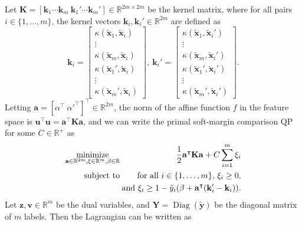 \documentclass[twoside,11pt]{article}
\newcommand{\RR}{\mathbb R}
\DeclareMathOperator*{\Diag}{Diag}
\DeclareMathOperator*{\minimize}{minimize}
\begin{document}
Let $\mathbf K=[
\mathbf k_1\cdots \mathbf k_m
\ \mathbf k_1'\cdots \mathbf k_m']\in\RR^{2m\times 2m}$ be the
kernel matrix, where for all pairs $i\in\{1, \dots, m\}$, the kernel
vectors $\mathbf k_i,\mathbf k_i'\in\RR^{2m}$ are defined as
\begin{equation}
  \mathbf k_i = \left[
    \begin{array}{c}
      \kappa(\mathbf{\tilde x}_1, \mathbf{\tilde x}_i)\\
      \vdots\\
      \kappa(\mathbf{\tilde x}_m, \mathbf{\tilde x}_i)\\
      \kappa(\mathbf{\tilde x}_1', \mathbf{\tilde x}_i)\\
      \vdots\\
      \kappa(\mathbf{\tilde x}_m', \mathbf{\tilde x}_i)
    \end{array}
  \right],\ 
  \mathbf k_i' = \left[
    \begin{array}{c}
      \kappa(\mathbf{\tilde x}_1, \mathbf{\tilde x}_i')\\
      \vdots\\
      \kappa(\mathbf{\tilde x}_m, \mathbf{\tilde x}_i')\\
      \kappa(\mathbf{\tilde x}_1', \mathbf{\tilde x}_i')\\
      \vdots\\
      \kappa(\mathbf{\tilde x}_m', \mathbf{\tilde x}_i')
    \end{array}
  \right].
\end{equation}
Letting $\mathbf a=[\alpha^\intercal\
\alpha'^\intercal]^\intercal\in\RR^{2m}$, the norm of the affine
function $f$ in the feature space is $\mathbf u^\intercal \mathbf u =
\mathbf a^\intercal \mathbf K \mathbf a$, and we can write the primal soft-margin
comparison QP for some $C\in\RR^+$ as
\begin{eqnarray}
  \minimize_{\mathbf a\in\RR^{2m},\mathbf \xi\in\RR^m,\beta\in\RR}\ \ &&\hskip -0.5cm 
  \frac 1 2 \mathbf a^\intercal \mathbf K \mathbf a + C\sum_{i=1}^m \xi_i \\
  \text{subject to}\ \ &&\hskip -0.5cm \nonumber
  \text{for all $i\in\{1,\dots,m\}$, }
  \xi_i \geq 0,\\
  &&\hskip -0.5cm \nonumber \text{and }
  \xi_i \geq 1-\tilde y_i(\beta + \mathbf a^\intercal (\mathbf k_i'-\mathbf k_i)).
\end{eqnarray}
Let $\mathbf z, \mathbf v\in\RR^m$ be the dual variables, and
$\mathbf Y=\Diag(\mathbf{\tilde y})$ be the diagonal matrix of $m$
labels. Then the Lagrangian can be written as
\end{document}
